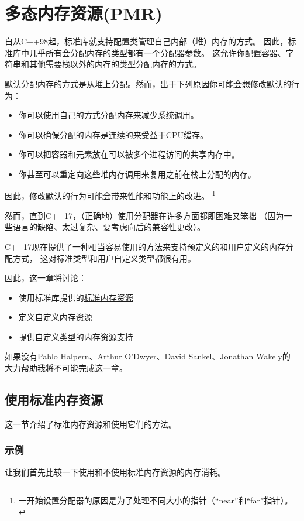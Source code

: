 \chapter{多态内存资源(PMR)}\label{ch29}
自从C++98起，标准库就支持配置类管理自己内部（堆）内存的方式。
因此，标准库中几乎所有会分配内存的类型都有一个分配器参数。
这允许你配置容器、字符串和其他需要栈以外的内存的类型分配内存的方式。

默认分配内存的方式是从堆上分配。然而，出于下列原因你可能会想修改默认的行为：
\begin{itemize}
    \item 你可以使用自己的方式分配内存来减少系统调用。
    \item 你可以确保分配的内存是连续的来受益于CPU缓存。
    \item 你可以把容器和元素放在可以被多个进程访问的共享内存中。
    \item 你甚至可以重定向这些堆内存调用来复用之前在栈上分配的内存。
\end{itemize}
因此，修改默认的行为可能会带来性能和功能上的改进。
\footnote{一开始设置分配器的原因是为了处理不同大小的指针（“near”和“far”指针）。}

然而，直到C++17，（正确地）使用分配器在许多方面都即困难又笨拙
（因为一些语言的缺陷、太过复杂、要考虑向后的兼容性更改）。

C++17现在提供了一种相当容易使用的方法来支持预定义的和用户定义的内存分配方式，
这对标准类型和用户自定义类型都很有用。

因此，这一章将讨论：
\begin{itemize}
    \item 使用标准库提供的\hyperref[ch29.1]{标准内存资源}
    \item 定义\hyperref[ch29.2]{自定义内存资源}
    \item 提供\hyperref[ch29.3]{自定义类型的内存资源支持}
\end{itemize}

如果没有Pablo Halpern、Arthur O'Dwyer、David Sankel、Jonathan Wakely的
大力帮助我将不可能完成这一章。


\section{使用标准内存资源}\label{ch29.1}
这一节介绍了标准内存资源和使用它们的方法。

\subsection{示例}
让我们首先比较一下使用和不使用标准内存资源的内存消耗。

